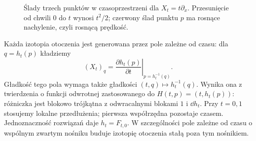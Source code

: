 \begin{figure}[!htbp]
\centering
{}
\caption{Ślady trzech punktów w czasoprzestrzeni dla
$X_t=t\partial_x$. Przesunięcie od chwili $0$ do $t$
wynosi $t^2/2$; czerwony ślad punktu $p$ ma rosnące
nachylenie, czyli rosnącą prędkość.}
\label{fig:izotopia-zmienna-predkosc}
\end{figure}

Każda izotopia otoczenia jest generowana przez pole zależne od
czasu: dla $q=h_t(p)$ kładziemy
\begin{equation}\label{eq:generator-izotopii}
 (X_t)_q=\left.\frac{\partial h_t(p)}{\partial t}
 \right|_{p=h_t^{-1}(q)}.
\end{equation}
Gładkość tego pola wymaga także gładkości $(t,q)\mapsto h_t^{-1}(q)$.
Wynika ona z twierdzenia o funkcji odwrotnej zastosowanego do
$H(t,p)=(t,h_t(p))$: różniczka jest blokowo trójkątna z
odwracalnymi blokami $1$ i $\dd h_t$. Przy $t=0,1$ stosujemy
lokalne przedłużenia; pierwsza współrzędna pozostaje czasem.
Jednoznaczność rozwiązań daje $h_t=F_{t,0}$.
W szczególności pole zależne od czasu
o wspólnym zwartym nośniku buduje izotopię otoczenia
stałą poza tym nośnikiem.

